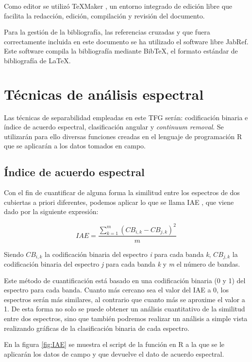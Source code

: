 Como editor se utilizó TeXMaker \citep{Brachet2003}, un entorno integrado de edición libre que facilita la redacción, edición, compilación y revisión del documento.\Sep

Para la gestión de la bibliografía, las referencias cruzadas y que fuera correctamente incluida en este documento se ha utilizado el software libre JabRef. Este software compila la bibliografía mediante BibTeX, el formato estándar de bibliografía de \LaTeX.

\section{Técnicas de análisis espectral} \label{sec:tecnicas}
Las técnicas de separabilidad empleadas en este \ac{TFG} serán: codificación binaria e índice de acuerdo espectral, clasificación angular y \textit{continuum removal}. Se utilizarán para ello diversas funciones creadas en el lenguaje de programación R que se aplicarán a los datos tomados en campo.

\subsection{Índice de acuerdo espectral}
Con el fin de cuantificar de alguna forma la similitud entre los espectros de dos cubiertas a priori diferentes, podemos aplicar lo que se llama \ac{IAE} \citep{chuvieco2002teledeteccion}, que viene dado por la siguiente expresión:

\begin{equation} \label{eq:IAE}
	IAE = \frac{\displaystyle\sum_{k=1}^m(CB_{i,k} - CB_{j,k})^{2}}{m}
\end{equation}\Sep

Siendo $CB_{i,k}$ la codificación binaria del espectro \textit{i} para cada banda \textit{k}, $CB_{j,k}$ la codificación binaria del espectro \textit{j} para cada banda \textit{k} y \textit{m} el número de bandas.\Sep

Este método de cuantificación está basado en una codificación binaria (0 y 1) del espectro para cada banda. Cuanto más cercano sea el valor del \ac{IAE} a 0, los espectros serán más similares, al contrario que cuanto más se aproxime el valor a 1. De esta forma no solo se puede obtener un análisis cuantitativo de la similitud entre dos espectros, sino que también podremos realizar un análisis a simple vista realizando gráficas de la clasificación binaria de cada espectro.\Sep

En la figura \ref{fig:IAE} se muestra el script de la función en R a la que se le aplicarán los datos de campo y que devuelve el dato de acuerdo espectral.

